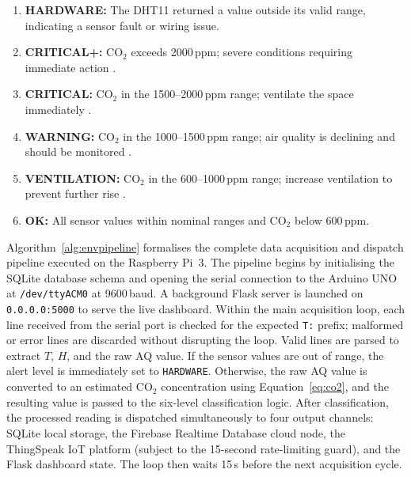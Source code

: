 \begin{enumerate}
  \item \textbf{HARDWARE:} The DHT11 returned a value outside its
        valid range, indicating a sensor fault or wiring issue.
  \item \textbf{CRITICAL+:} CO$_2$ exceeds 2000\,ppm; severe
        conditions requiring immediate action \cite{r47,r48}.
  \item \textbf{CRITICAL:} CO$_2$ in the 1500--2000\,ppm range;
        ventilate the space immediately \cite{r47}.
  \item \textbf{WARNING:} CO$_2$ in the 1000--1500\,ppm range;
        air quality is declining and should be monitored \cite{r48,r49}.
  \item \textbf{VENTILATION:} CO$_2$ in the 600--1000\,ppm range;
        increase ventilation to prevent further rise \cite{r46}.
  \item \textbf{OK:} All sensor values within nominal ranges and
        CO$_2$ below 600\,ppm.
\end{enumerate}

Algorithm~\ref{alg:envpipeline} formalises the complete data acquisition and dispatch pipeline executed on the Raspberry Pi~3. The pipeline begins by initialising the SQLite database schema and opening the serial connection to the Arduino UNO at \texttt{/dev/ttyACM0} at 9600\,baud. A background Flask server is launched on \texttt{0.0.0.0:5000} to serve the live dashboard. Within the main acquisition loop, each line received from the serial port is checked for the expected \texttt{T:} prefix; malformed or error lines are discarded without disrupting the loop. Valid lines are parsed to extract $T$, $H$, and the raw AQ value. If the sensor values are out of range, the alert level is immediately set to \texttt{HARDWARE}. Otherwise, the raw AQ value is converted to an estimated CO$_2$ concentration using Equation~\eqref{eq:co2}, and the resulting value is passed to the six-level classification logic. After classification, the processed reading is dispatched simultaneously to four output channels: SQLite local storage, the Firebase Realtime Database cloud node, the ThingSpeak IoT platform (subject to the 15-second rate-limiting guard), and the Flask dashboard state. The loop then waits 15\,s before the next acquisition cycle.

